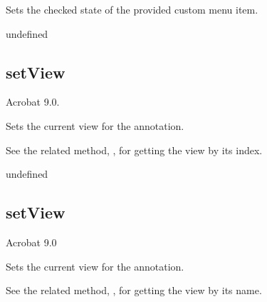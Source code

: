 \documentclass[letterpaper,12pt,english,openany,oneside]{sphinxmanual}
\begin{document}
Sets the checked state of the provided custom menu item.

\label{\detokenize{JS_3D_API:syntax-97}}

\begin{sphinxVerbatim}[commandchars=\\\{\}]
   
\end{sphinxVerbatim}
\label{\detokenize{JS_3D_API:parameters-71}}

\label{\detokenize{JS_3D_API:section-99}}\label{\detokenize{JS_3D_API:returns-98}}

undefined


\subsection{setView}
\label{\detokenize{JS_3D_API:setview-1}}\label{\detokenize{JS_3D_API:id29}}
Acrobat 9.0.

Sets the current view for the annotation.

See the related method, , for getting the view by its index.

\label{\detokenize{JS_3D_API:syntax-98}}

\begin{sphinxVerbatim}[commandchars=\\\{\}]
  
\end{sphinxVerbatim}
\label{\detokenize{JS_3D_API:parameters-72}}

\label{\detokenize{JS_3D_API:section-100}}\label{\detokenize{JS_3D_API:returns-99}}

undefined


\subsection{setView}
\label{\detokenize{JS_3D_API:setview-2}}\label{\detokenize{JS_3D_API:id30}}
Acrobat 9.0

Sets the current view for the annotation.

See the related method, , for getting the view by its name.
\end{document}

